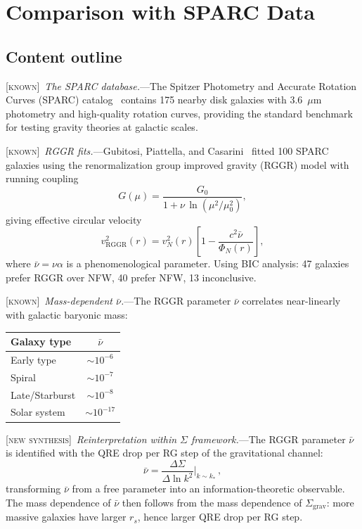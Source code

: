 \documentclass[prl,twocolumn,superscriptaddress,longbibliography,floatfix]{revtex4-2}
\newcommand{\known}{\textsc{[known]}}
\newcommand{\newsyn}{\textsc{[new synthesis]}}
\begin{document}
\section{Comparison with SPARC Data}
\label{sec:sparc}

\subsection*{Content outline}

\known\ \emph{The SPARC database.}---The Spitzer Photometry
and Accurate Rotation Curves (SPARC) catalog~\cite{SPARC2016}
contains 175 nearby disk galaxies with 3.6~$\mu$m photometry
and high-quality rotation curves, providing the standard
benchmark for testing gravity theories at galactic scales.

\known\ \emph{RGGR fits.}---Gubitosi, Piattella, and
Casarini~\cite{Gubitosi2024} fitted 100 SPARC galaxies using
the renormalization group improved gravity (RGGR) model with
running coupling
\begin{equation}
G(\mu) = \frac{G_0}{1 + \nu\,\ln(\mu^2/\mu_0^2)},
\label{eq:G_RGGR}
\end{equation}
giving effective circular velocity
\begin{equation}
v_{\mathrm{RGGR}}^2(r) = v_N^2(r)
  \!\left[1 - \frac{c^2 \bar{\nu}}{\Phi_N(r)}\right],
\label{eq:v_RGGR}
\end{equation}
where $\bar{\nu} = \nu\alpha$ is a phenomenological parameter.
Using BIC analysis: 47 galaxies prefer RGGR over NFW,
40 prefer NFW, 13 inconclusive.

\known\ \emph{Mass-dependent $\bar{\nu}$.}---The RGGR parameter
$\bar{\nu}$ correlates near-linearly with galactic baryonic mass:
\begin{center}
\begin{tabular}{lc}
\toprule
Galaxy type & $\bar{\nu}$ \\
\midrule
Early type & $\sim 10^{-6}$ \\
Spiral & $\sim 10^{-7}$ \\
Late/Starburst & $\sim 10^{-8}$ \\
Solar system & $\sim 10^{-17}$ \\
\bottomrule
\end{tabular}
\end{center}

\newsyn\ \emph{Reinterpretation within $\Sigma$ framework.}---The
RGGR parameter $\bar{\nu}$ is identified with the QRE drop per
RG step of the gravitational channel:
\begin{equation}
\bar{\nu} = \frac{\Delta\Sigma}{\Delta\ln k^2}
  \bigg|_{k \sim k_*}\,,
\label{eq:nu_sigma}
\end{equation}
transforming $\bar{\nu}$ from a free parameter into an
information-theoretic observable. The mass dependence of
$\bar{\nu}$ then follows from the mass dependence of
$\Sigma_{\mathrm{grav}}$: more massive galaxies have larger
$r_s$, hence larger QRE drop per RG step.
\end{document}
